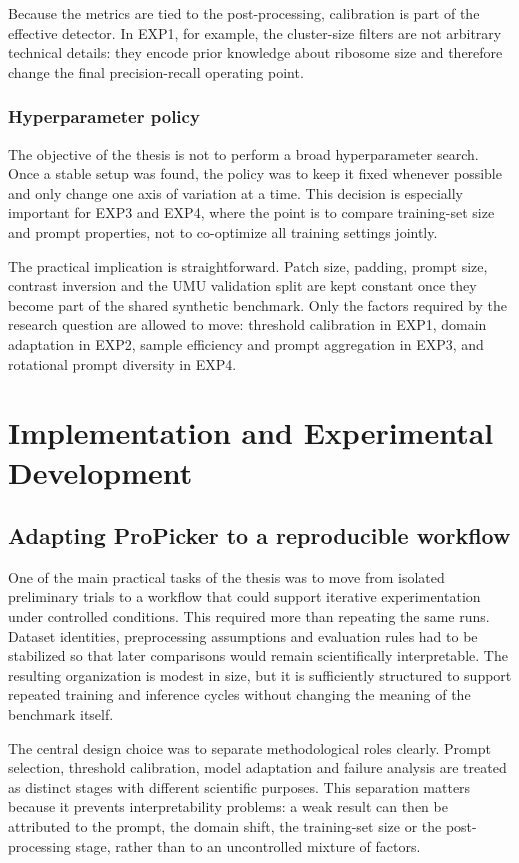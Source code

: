 \documentclass[12pt,a4paper]{report}
\begin{document}
Because the metrics are tied to the post-processing, calibration is part of the effective detector. In EXP1, for example, the cluster-size filters are not arbitrary technical details: they encode prior knowledge about ribosome size and therefore change the final precision-recall operating point.

\subsection{Hyperparameter policy}
The objective of the thesis is not to perform a broad hyperparameter search. Once a stable setup was found, the policy was to keep it fixed whenever possible and only change one axis of variation at a time. This decision is especially important for EXP3 and EXP4, where the point is to compare training-set size and prompt properties, not to co-optimize all training settings jointly.

The practical implication is straightforward. Patch size, padding, prompt size, contrast inversion and the UMU validation split are kept constant once they become part of the shared synthetic benchmark. Only the factors required by the research question are allowed to move: threshold calibration in EXP1, domain adaptation in EXP2, sample efficiency and prompt aggregation in EXP3, and rotational prompt diversity in EXP4.

\chapter{Implementation and Experimental Development}

\section{Adapting ProPicker to a reproducible workflow}
One of the main practical tasks of the thesis was to move from isolated preliminary trials to a workflow that could support iterative experimentation under controlled conditions. This required more than repeating the same runs. Dataset identities, preprocessing assumptions and evaluation rules had to be stabilized so that later comparisons would remain scientifically interpretable. The resulting organization is modest in size, but it is sufficiently structured to support repeated training and inference cycles without changing the meaning of the benchmark itself.

The central design choice was to separate methodological roles clearly. Prompt selection, threshold calibration, model adaptation and failure analysis are treated as distinct stages with different scientific purposes. This separation matters because it prevents interpretability problems: a weak result can then be attributed to the prompt, the domain shift, the training-set size or the post-processing stage, rather than to an uncontrolled mixture of factors.
\end{document}

